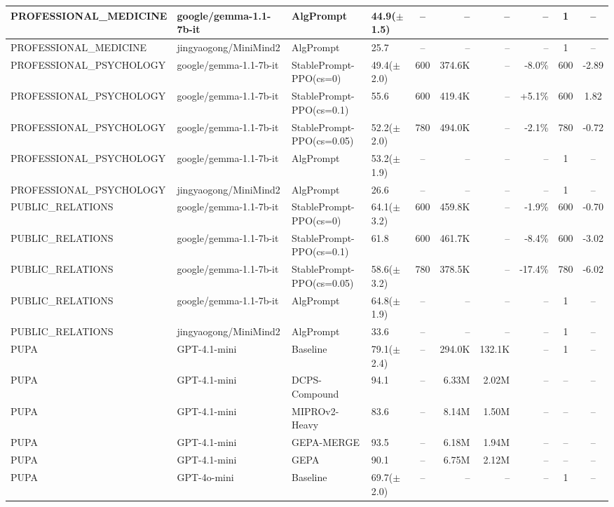 {\begin{longtable}{@{}p{5.5cm}p{4.5cm}p{2.5cm}lcrrrcc@{}}
PROFESSIONAL\_MEDICINE & google/gemma-1.1-7b-it & AlgPrompt & 44.9($\pm$1.5) & -- & -- & -- & -- & 1 & -- \\
\midrule
PROFESSIONAL\_MEDICINE & jingyaogong/MiniMind2 & AlgPrompt & 25.7 & -- & -- & -- & -- & 1 & -- \\
\midrule
PROFESSIONAL\_PSYCHOLOGY & google/gemma-1.1-7b-it & StablePrompt-PPO(cs=0) & 49.4($\pm$2.0) & 600 & 374.6K & -- & -8.0\% & 600 & -2.89 \\
PROFESSIONAL\_PSYCHOLOGY & google/gemma-1.1-7b-it & StablePrompt-PPO(cs=0.1) & 55.6 & 600 & 419.4K & -- & +5.1\% & 600 & 1.82 \\
PROFESSIONAL\_PSYCHOLOGY & google/gemma-1.1-7b-it & StablePrompt-PPO(cs=0.05) & 52.2($\pm$2.0) & 780 & 494.0K & -- & -2.1\% & 780 & -0.72 \\
PROFESSIONAL\_PSYCHOLOGY & google/gemma-1.1-7b-it & AlgPrompt & 53.2($\pm$1.9) & -- & -- & -- & -- & 1 & -- \\
\midrule
PROFESSIONAL\_PSYCHOLOGY & jingyaogong/MiniMind2 & AlgPrompt & 26.6 & -- & -- & -- & -- & 1 & -- \\
\midrule
PUBLIC\_RELATIONS & google/gemma-1.1-7b-it & StablePrompt-PPO(cs=0) & 64.1($\pm$3.2) & 600 & 459.8K & -- & -1.9\% & 600 & -0.70 \\
PUBLIC\_RELATIONS & google/gemma-1.1-7b-it & StablePrompt-PPO(cs=0.1) & 61.8 & 600 & 461.7K & -- & -8.4\% & 600 & -3.02 \\
PUBLIC\_RELATIONS & google/gemma-1.1-7b-it & StablePrompt-PPO(cs=0.05) & 58.6($\pm$3.2) & 780 & 378.5K & -- & -17.4\% & 780 & -6.02 \\
PUBLIC\_RELATIONS & google/gemma-1.1-7b-it & AlgPrompt & 64.8($\pm$1.9) & -- & -- & -- & -- & 1 & -- \\
\midrule
PUBLIC\_RELATIONS & jingyaogong/MiniMind2 & AlgPrompt & 33.6 & -- & -- & -- & -- & 1 & -- \\
\midrule
PUPA & GPT-4.1-mini & Baseline & 79.1($\pm$2.4) & -- & 294.0K & 132.1K & -- & 1 & -- \\
PUPA & GPT-4.1-mini & DCPS-Compound & 94.1 & -- & 6.33M & 2.02M & -- & -- & -- \\
PUPA & GPT-4.1-mini & MIPROv2-Heavy & 83.6 & -- & 8.14M & 1.50M & -- & -- & -- \\
PUPA & GPT-4.1-mini & GEPA-MERGE & 93.5 & -- & 6.18M & 1.94M & -- & -- & -- \\
PUPA & GPT-4.1-mini & GEPA & 90.1 & -- & 6.75M & 2.12M & -- & -- & -- \\
\midrule
PUPA & GPT-4o-mini & Baseline & 69.7($\pm$2.0) & -- & -- & -- & -- & 1 & -- \\

\end{longtable}}
